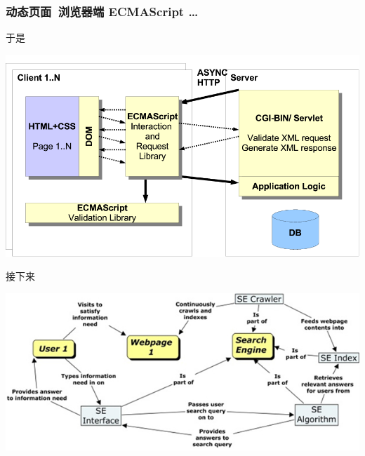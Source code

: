 \documentclass{beamer}
\begin{document}
\begin{frame}
	\frametitle{动态页面~{\small 浏览器端 ECMAScript \dots}}
	于是 \\
	\begin{center}
	\includegraphics[width=\textwidth]{images/interaction-ajax.png}
	\end{center}
\end{frame}

\begin{frame}[plain]
	接下来 \\
	\begin{center}
	\includegraphics[width=.9\textwidth]{images/webpage-search-engine-user-interaction.jpg}
	\end{center}
\end{frame}
\end{document}
